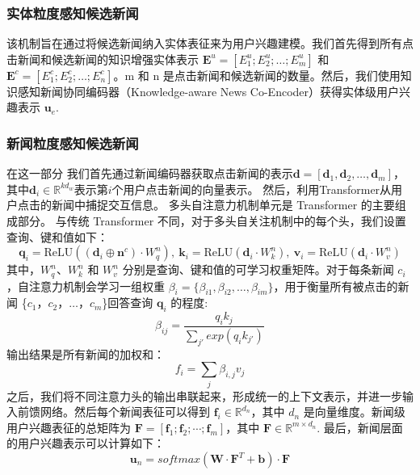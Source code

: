 \documentclass[withoutpreface,bwprint]{cumcmthesis} %
\begin{document}
	\subsubsection{ 实体粒度感知候选新闻 }
	该机制旨在通过将候选新闻纳入实体表征来为用户兴趣建模。我们首先得到所有点击新闻和候选新闻的知识增强实体表示 $\mathbf{E}^{u} = [E^u_1;E^u_2;\dots;E^u_m] $ 和 $\mathbf{E}^{c} = [E^c_1;E^c_2;\dots;E^c_n] $。m 和 n 是点击新闻和候选新闻的数量。然后，我们使用知识感知新闻协同编码器（Knowledge-aware News Co-Encoder）获得实体级用户兴趣表示 $\mathbf{u}_e $.
	\subsubsection{ 新闻粒度感知候选新闻}
	在这一部分 
	我们首先通过新闻编码器获取点击新闻的表示$\mathbf{d}=[\mathbf{d}_1, \mathbf{d}_2,\dots,\mathbf{d}_m]$，其中$\mathbf{d}_i \in \mathbb{R}^{kd_w}$表示第$i$个用户点击新闻的向量表示。
	然后，利用Transformer从用户点击的新闻中捕捉交互信息。
	多头自注意力机制单元是 Transformer 的主要组成部分。
	与传统 Transformer 不同，对于多头自关注机制中的每个头，我们设置查询、键和值如下：
	\begin{equation}\label{eatt}
	\mathbf{q}_{i} = \mathrm{ReLU}((\mathbf{d}_i \oplus \mathbf{n}^c) \cdot W^n_q),~ \mathbf{k}_{i} = \mathrm{ReLU}(\mathbf{d}_i \cdot W^n_k),~
	\mathbf{v}_{i} = \mathrm{ReLU}(\mathbf{d}_i \cdot W^n_v)
	\end{equation}
	其中，$W^n_q$、$W^n_k$ 和 $W^n_v$ 分别是查询、键和值的可学习权重矩阵。对于每条新闻 $c_i$，自注意力机制会学习一组权重 $\beta_i = \{\beta_{i1}, \beta_{i2}, \dots, \beta_{im}\}$，用于衡量所有被点击的新闻 \{$c_1$，$c_2$，$\dots$，$c_m$\}回答查询 $\mathbf{q}_i$ 的程度:
	\begin{equation}
	\beta_{ij} = \frac{q_ik_j}{\sum_{j'}exp(q_ik_{j'})}
	\end{equation}
	输出结果是所有新闻的加权和：
	\begin{equation}
	f_i = \sum_j \beta_{i,j}v_j
	\end{equation}
	之后，我们将不同注意力头的输出串联起来，形成统一的上下文表示，并进一步输入前馈网络。然后每个新闻表征可以得到 $\mathbf{f}_i \in \mathbb{R}^{d_n}$，其中 $d_n$ 是向量维度。新闻级用户兴趣表征的总矩阵为 $\mathbf{F}=[\mathbf{f}_1; \mathbf{f}_2; \cdots; \mathbf{f}_m]$，其中 $\mathbf{F} \in \mathbb{R}^{m \times d_n}$.
	最后，新闻层面的用户兴趣表示可以计算如下：
	\begin{equation}
	\mathbf{u}_n = softmax( \mathbf{W} \cdot \mathbf{F}^{T} + \mathbf{b}) \cdot \mathbf{F}
	\end{equation}
\end{document}
